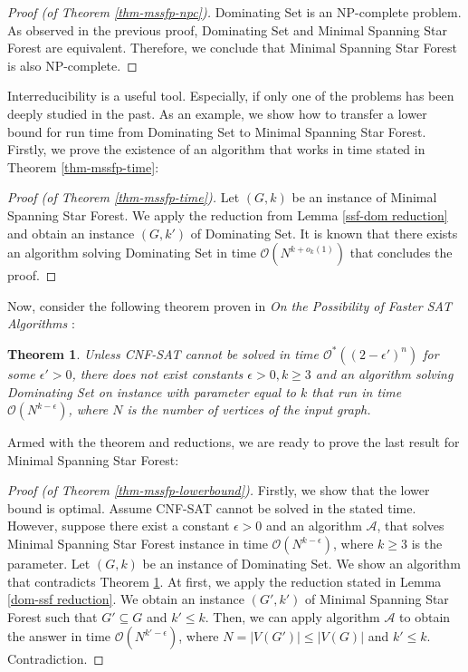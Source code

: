 \documentclass[en]{pracamgr}
\newtheorem{theorem}{Theorem}
\theoremstyle{definition}
\newcommand{\mssfp}{{\sc Minimal Spanning Star Forest}}
\newcommand{\domsetp}{{\sc Dominating Set}}
\newcommand{\cnfsat}{{\sc CNF-SAT}}
\begin{document}
\begin{proof}[Proof (of Theorem \ref{thm-mssfp-npc})]
	\domsetp{} is an NP-complete problem. As observed in the previous proof, \domsetp{} and \mssfp{} are equivalent. Therefore, we conclude that \mssfp{} is  also NP-complete.
\end{proof}

Interreducibility is a useful tool. Especially, if only one of the problems has been deeply studied in the past. As an example, we show how to transfer a lower bound for run time from \domsetp{} to \mssfp{}. Firstly, we prove the existence of an algorithm that works in time stated in Theorem \ref{thm-mssfp-time}:

\begin{proof}[Proof (of Theorem \ref{thm-mssfp-time})]
	Let $(G,k)$ be an instance of \mssfp{}. We apply the reduction from Lemma \ref{ssf-dom reduction} and obtain an instance $(G,k')$ of \domsetp{}. It is known that there exists an algorithm solving \domsetp{} in time $\mathcal{O}(N^{k + o_k(1)})$ that concludes the proof.
\end{proof}

Now, consider the following theorem proven in \textit{On the Possibility of Faster SAT Algorithms} \cite{DomSet}:

\begin{theorem}\label{domset-seth}
	Unless \cnfsat{} cannot be solved in time $\mathcal{O}^*((2-\epsilon')^n)$ for some $\epsilon' > 0$, there does not exist constants $\epsilon > 0, k \geq 3$ and an algorithm solving \domsetp{} on instance with parameter equal to $k$ that run in time $\mathcal{O}(N^{k-\epsilon})$, where $N$ is the number of vertices of the input graph.
\end{theorem}

Armed with the theorem and reductions, we are ready to prove the last result for \mssfp{}:

\begin{proof}[Proof (of Theorem \ref{thm-mssfp-lowerbound})]
	Firstly, we show that the lower bound is optimal. Assume \cnfsat{} cannot be solved in the stated time. However, suppose there exist a constant $\epsilon > 0$ and an algorithm $\mathcal{A}$, that solves \mssfp{} instance in time $\mathcal{O}(N^{k-\epsilon})$, where $k \geq 3$ is the parameter. Let $(G,k)$ be an instance of \domsetp{}. We show an algorithm that contradicts Theorem \ref{domset-seth}. At first, we apply the reduction stated in Lemma \ref{dom-ssf reduction}. We obtain an instance $(G',k')$ of \mssfp{} such that $G' \subseteq G$ and $k' \leq k$. Then, we can apply algorithm $\mathcal{A}$ to obtain the answer in time $\mathcal{O}(N^{k'-\epsilon})$, where $N=|V(G')| \leq |V(G)|$ and $k'\leq k$. Contradiction.
\end{proof}
\end{document}
